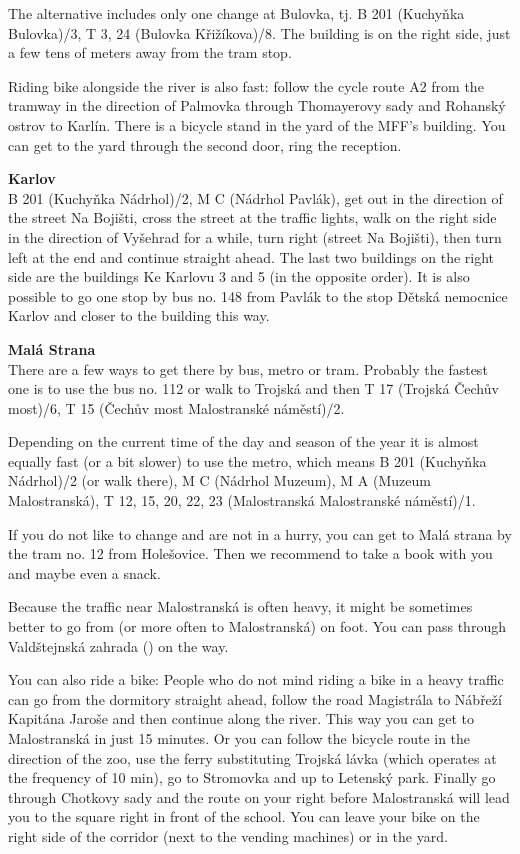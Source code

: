 The alternative includes only one change at Bulovka, tj. B 201
(Kuchyňka \ra Bulovka)/3, T 3, 24 (Bulovka \ra Křižíkova)/8. The building is on
the right side, just a few tens of meters away from the tram stop.

Riding bike alongside the river is also fast: follow the cycle route A2 from the
tramway in the direction of Palmovka through Thomayerovy sady and Rohanský
ostrov to Karlín.
There is a bicycle stand in the yard of the MFF's building. You can get to the
yard through the second door, ring the reception.

\textbf{Karlov} \\
B 201 (Kuchyňka \ra Nádrhol)/2, M C (Nádrhol \ra Pavlák), get out in the
direction of the street Na Bojišti, cross the street at the traffic lights, walk
on the right side in the direction of Vyšehrad for a while, turn right (street
Na Bojišti), then turn left at the end and continue straight ahead. The last two
buildings on the right side are the buildings Ke Karlovu 3 and 5 (in the
opposite order).
It is also possible to go one stop by bus no. 148 from Pavlák to the stop Dětská
nemocnice Karlov and closer to the building this way.

\textbf{Malá Strana}\\
There are a few ways to get there by bus, metro or tram.
Probably the fastest one is to use the bus no. 112 or walk to Trojská and then T
17 (Trojská \ra Čechův most)/6, T 15 (Čechův most \ra
Malostranské náměstí)/2.

Depending on the current time of the day and season of the year it is almost
equally fast (or a bit slower) to use the metro, which means B 201 (Kuchyňka \ra
Nádrhol)/2 (or walk there), M C (Nádrhol \ra Muzeum), M A (Muzeum \ra
Malostranská), T 12, 15, 20,
22, 23 (Malostranská \ra Malostranské náměstí)/1.

If you do not like to change and are not in a hurry, you can get to Malá strana
by the tram no. 12 from Holešovice. Then we recommend to take a book with you
and maybe even a snack.

Because the traffic near Malostranská is often heavy, it might be sometimes
better to go from (or more often to Malostranská) on foot. You can pass through
Valdštejnská zahrada () on the way.

You can also ride a bike:
People who do not mind riding a bike in a heavy traffic can go from the
dormitory straight ahead, follow the road Magistrála to Nábřeží Kapitána Jaroše
and then continue along the river. This way you can get to Malostranská in just
15 minutes.
Or you can follow the bicycle route in the direction of the zoo, use the ferry
substituting Trojská lávka (which operates at the frequency of 10 min), go to
Stromovka and up to Letenský park.
Finally go through Chotkovy sady and the route on your right before Malostranská
will lead you to the square right in front of the school.
You can leave your bike on the right side of the corridor (next to the vending
machines) or in the yard.

